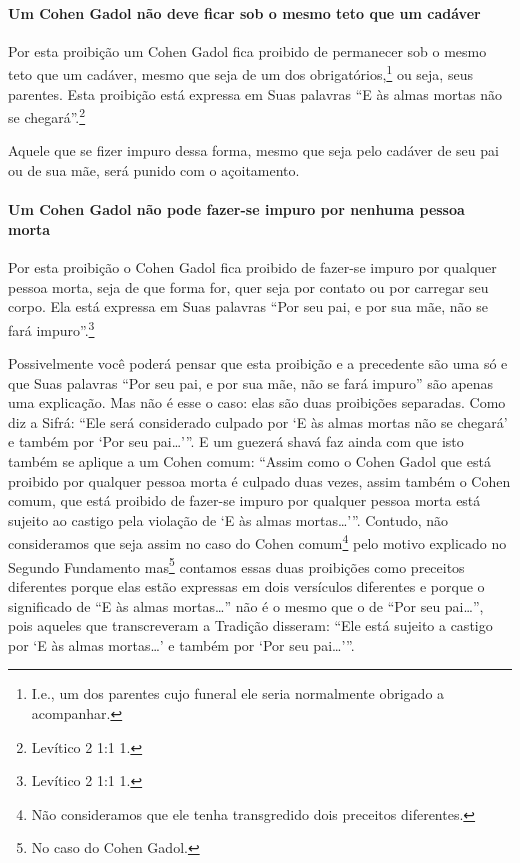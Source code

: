\paragraph{Um Cohen Gadol não deve ficar sob o mesmo teto que um cadáver}

Por esta proibição um Cohen Gadol fica proibido de permanecer sob o
mesmo teto que um cadáver, mesmo que seja de um dos
obrigatórios,\footnote{I.e., um dos parentes cujo funeral ele seria normalmente obrigado a acompanhar.} ou seja, seus parentes. Esta
proibição está expressa em Suas palavras ``E às almas mortas não se
chegará''.\footnote{Levítico 2 1:1 1.}

Aquele que se fizer impuro dessa forma, mesmo que seja pelo cadáver de
seu pai ou de sua mãe, será punido com o açoitamento.

\paragraph{Um Cohen Gadol não pode fazer-se impuro por nenhuma pessoa morta}

Por esta proibição o Cohen Gadol fica proibido de fazer-se impuro
por qualquer pessoa morta, seja de que forma for, quer seja por contato
ou por carregar seu corpo. Ela está expressa em Suas palavras ``Por seu
pai, e por sua mãe, não se fará impuro''.\footnote{Levítico 2 1:1 1.}

Possivelmente você poderá pensar que esta proibição e a precedente são
uma só e que Suas palavras ``Por seu pai, e por sua mãe, não se fará
impuro'' são apenas uma explicação. Mas não é esse o caso: elas são
duas proibições separadas. Como diz a Sifrá: ``Ele será considerado
culpado por `E às almas mortas não se chegará' e também por `Por seu
pai\ldots{}'''. E um guezerá shavá\starr{} faz ainda com
que isto também se aplique a um Cohen comum: ``Assim como o Cohen
Gadol que está proibido por qualquer pessoa morta é culpado duas vezes,
assim também o Cohen comum, que está proibido de fazer-se impuro por
qualquer pessoa morta está sujeito ao castigo pela violação de `E às
almas mortas\ldots{}'''. Contudo, não consideramos que seja assim no caso do
Cohen comum\footnote{Não consideramos que ele tenha transgredido dois preceitos
  diferentes.} pelo motivo explicado no Segundo
Fundamento mas\footnote{No caso do Cohen Gadol.} contamos essas duas proibições
como preceitos diferentes porque elas estão expressas em dois
versículos diferentes e porque o significado de ``E às almas
mortas\ldots{}'' não é o mesmo que o de ``Por seu pai\ldots{}'', pois aqueles que
transcreveram a Tradição disseram: ``Ele está sujeito a castigo por `E
às almas mortas\ldots{}' e também por `Por seu pai\ldots{}'''.

